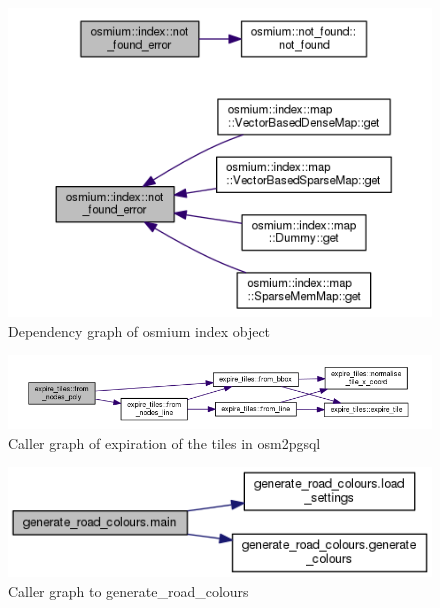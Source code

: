 \begin{figure}
	\centering
	\includegraphics[scale=.8]{input/images/dep_osmium_index.png}
	\caption{Dependency graph of osmium index object}
	\label{fig:comment1}
\end{figure}

\begin{figure}
\centering
\includegraphics[width=1\linewidth]{input/images/dep_expire_tiles.png}
\caption{Caller graph of expiration of the tiles in osm2pgsql}
\label{fig:comment}
\end{figure}
\begin{figure}
\centering
\includegraphics[width=1\linewidth,height=1\columnwidth]{input/images/dep_road.png}
\caption{Caller graph to generate\_road\_colours}
\label{fig:dependency}
\end{figure}


